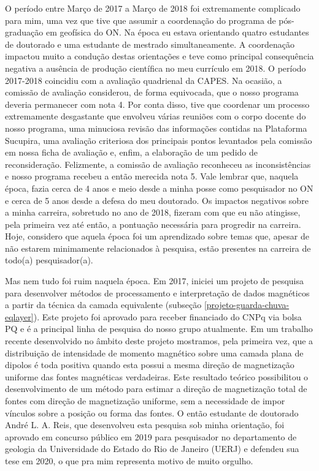 O período entre Março de 2017 a Março de 2018 foi extremamente complicado para mim,
uma vez que tive que assumir a coordenação do programa de pós-graduação em geofísica 
do ON. Na época eu estava orientando quatro estudantes de doutorado e uma estudante de 
mestrado simultaneamente. A coordenação impactou muito a condução destas orientações 
e teve como principal consequência negativa a ausência de produção científica no meu 
currículo em 2018. O período 2017-2018 coincidiu com a avaliação quadrienal da CAPES.
Na ocasião, a comissão de avaliação considerou, de forma equivocada, que o nosso programa 
deveria permanecer com nota 4. Por conta disso, tive que coordenar um processo 
extremamente desgastante que envolveu várias reuniões com o corpo docente do nosso 
programa, uma minuciosa revisão das informações contidas na Plataforma Sucupira, 
uma avaliação criteriosa dos principais pontos levantados pela comissão em nossa 
ficha de avaliação e, enfim, a elaboração de um pedido de reconsideração. 
Felizmente, a comissão de avaliação reconheceu as inconsistências e nosso programa 
recebeu a então merecida nota 5. Vale lembrar que, naquela época, fazia cerca de 4 anos 
e meio desde a minha posse como pesquisador no ON e cerca de 5 anos desde a defesa do 
meu doutorado. Os impactos negativos sobre a minha carreira, sobretudo no ano de 2018,
fizeram com que eu não atingisse, pela primeira vez até então, a pontuação necessária 
para progredir na carreira. 
Hoje, considero que aquela época foi um aprendizado sobre temas que, apesar de não
estarem minimamente relacionados à pesquisa, estão presentes na carreira de todo(a)
pesquisador(a).

Mas nem tudo foi ruim naquela época. Em 2017, iniciei um projeto de pesquisa para 
desenvolver métodos de processamento e interpretação de dados magnéticos a partir 
da técnica da camada equivalente (subseção \ref{projeto-guarda-chuva-eqlayer}). 
Este projeto foi aprovado para receber financiado do CNPq via bolsa PQ e é a 
principal linha de pesquisa do nosso grupo atualmente. 
Em um trabalho recente desenvolvido no âmbito deste projeto mostramos, pela primeira
vez, que a distribuição de intensidade de momento magnético sobre uma camada plana 
de dipolos é toda positiva quando esta possui a mesma direção de magnetização uniforme 
das fontes magnéticas verdadeiras. Este resultado teórico possibilitou o desenvolvimento 
de um método para estimar a direção de magnetização total de fontes com direção de 
magnetização uniforme, sem a necessidade de impor vínculos sobre a posição ou forma 
das fontes. O então estudante de doutorado André L. A. Reis, que desenvolveu esta 
pesquisa sob minha orientação, foi aprovado em concurso público em 2019 
para pesquisador no departamento de geologia da Universidade do Estado do Rio de 
Janeiro (UERJ) e defendeu sua tese em 2020, o que pra mim representa motivo de muito 
orgulho.

